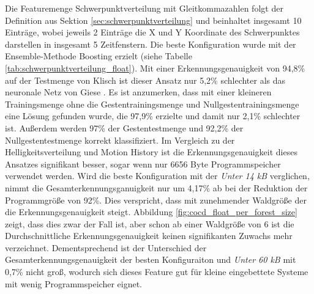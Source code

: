 Die Featuremenge Schwerpunktverteilung mit Gleitkommazahlen folgt der Definition aus Sektion \ref{sec:schwerpunktverteilung} und beinhaltet insgesamt 10 Einträge, wobei jeweils 2 Einträge die X und Y
Koordinate des Schwerpunktes darstellen in insgesamt 5 Zeitfenstern.
\newline
\newline
Die beste Konfiguration wurde mit der Ensemble-Methode Boosting erzielt (siehe Tabelle \ref{tab:schwerpunktverteilung_float}). Mit einer Erkennungsgenauigkeit von 94,8\% auf der Testmenge von Klisch
ist dieser Ansatz nur 5,2\% schlechter als das neuronale Netz von Giese \cite{gieseThesis}. Es ist anzumerken, dass mit einer kleineren Trainingsmenge ohne die Gestentrainingsmenge und Nullgestentrainingsmenge eine Lösung
gefunden wurde, die 97,9\% erzielte und damit nur 2,1\% schlechter ist. Außerdem werden 97\% der Gestentestmenge und 92,2\% der Nullgestentestmenge korrekt klassifiziert.
\newline
\newline
Im Vergleich zu der Helligkeitsverteilung und Motion History ist die Erkennungsgenauigkeit dieses Ansatzes signifikant besser, sogar wenn nur 6656 Byte Programmspeicher verwendet werden. Wird die beste Konfiguration mit
der \textit{Unter 14 kB} verglichen, nimmt die Gesamterkennungsganuigkeit nur um 4,17\% ab bei der Reduktion der Programmgröße von 92\%. Dies verspricht, dass mit zunehmender Waldgröße der die Erkennungsgenauigkeit steigt.
Abbildung \ref{fig:cocd_float_per_forest_size} zeigt, dass dies zwar der Fall ist, aber schon ab einer Waldgröße von 6 ist die Durchschnittliche Erkennungsgenauigkeit keinen signifikanten Zuwachs mehr verzeichnet.
Dementsprechend ist der Unterschied der Gesamterkennungsgenauigkeit der besten Konfiguraiton und \textit{Unter 60 kB} mit 0,7\% nicht groß, wodurch sich dieses Feature gut für kleine eingebettete Systeme mit
wenig Programmspeicher eignet.